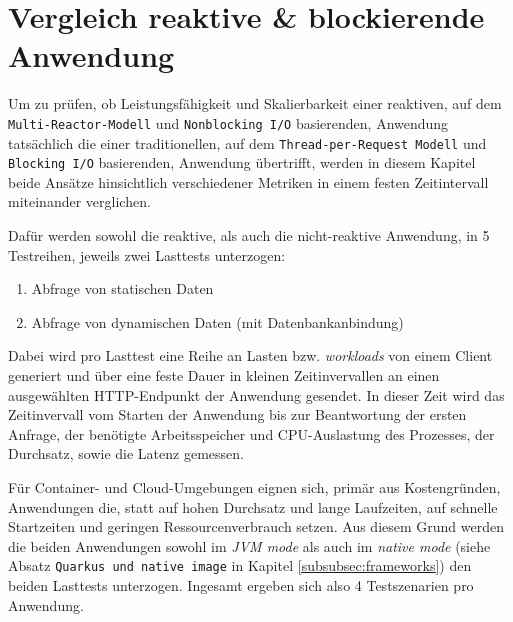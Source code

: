 \section {Vergleich reaktive \& blockierende Anwendung}
\label{section:vergleich_reaktiv_blockierend}
Um zu prüfen, ob Leistungsfähigkeit und Skalierbarkeit einer reaktiven, auf dem \newline
\verb|Multi-Reactor-Modell| und \verb|Nonblocking I/O| basierenden,
Anwendung tatsächlich die einer traditionellen, auf dem \verb|Thread-per-Request Modell| und \verb|Blocking I/O| basierenden, Anwendung übertrifft, werden in
diesem Kapitel beide Ansätze hinsichtlich verschiedener Metriken in einem festen Zeitintervall miteinander verglichen.

Dafür werden sowohl die reaktive, als auch die nicht-reaktive Anwendung, in 5 Testreihen, jeweils zwei Lasttests unterzogen:
\begin{enumerate}
    \item Abfrage von statischen Daten
    \item Abfrage von dynamischen Daten (mit Datenbankanbindung)
\end{enumerate}
Dabei wird pro Lasttest eine Reihe an Lasten bzw. \textit{workloads} von einem Client generiert und über eine feste Dauer in kleinen Zeitinvervallen
an einen ausgewählten HTTP-Endpunkt der Anwendung gesendet.
In dieser Zeit wird das Zeitinvervall vom Starten der Anwendung bis zur Beantwortung der ersten Anfrage,
der benötigte Arbeitsspeicher und CPU-Auslastung des Prozesses, der Durchsatz, sowie die Latenz gemessen.

Für Container- und Cloud-Umgebungen eignen sich, primär aus Kostengründen, Anwendungen die, statt auf hohen Durchsatz und lange Laufzeiten, auf
schnelle Startzeiten und geringen Ressourcenverbrauch setzen.
Aus diesem Grund werden die beiden Anwendungen sowohl im \textit{JVM mode} als auch im \textit{native mode}
(siehe Absatz \verb|Quarkus und native image| in Kapitel \ref{subsubsec:frameworks})
den beiden Lasttests unterzogen. Ingesamt ergeben sich also 4 Testszenarien pro Anwendung.

